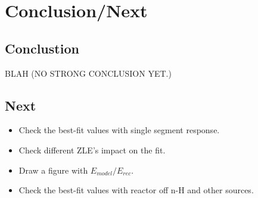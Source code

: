 \section{Conclusion/Next}
\subsection{Conclustion}
BLAH (NO STRONG CONCLUSION YET.)
\subsection{Next}
\begin{itemize}
    \item Check the best-fit values with single segment response.
    \item Check different ZLE's impact on the fit.
    \item Draw a figure with $E_{model}/E_{rec}$.
    \item Check the best-fit values with reactor off n-H and other sources.
\end{itemize}



%

